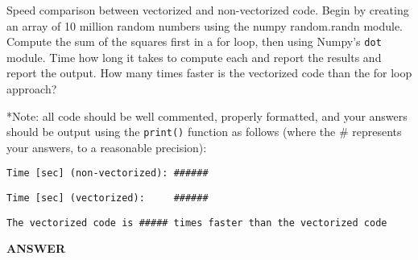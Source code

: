 \documentclass[11pt]{article}
\begin{document}
Speed comparison between vectorized and non-vectorized code. Begin by
creating an array of 10 million random numbers using the numpy
random.randn module. Compute the sum of the squares first in a for loop,
then using Numpy's \texttt{dot} module. Time how long it takes to
compute each and report the results and report the output. How many
times faster is the vectorized code than the for loop approach?

*Note: all code should be well commented, properly formatted, and your
answers should be output using the \texttt{print()} function as follows
(where the \# represents your answers, to a reasonable precision):

\texttt{Time\ {[}sec{]}\ (non-vectorized):\ \#\#\#\#\#\#}

\texttt{Time\ {[}sec{]}\ (vectorized):\ \ \ \ \ \#\#\#\#\#\#}

\texttt{The\ vectorized\ code\ is\ \#\#\#\#\#\ times\ faster\ than\ the\ vectorized\ code}

    \textbf{ANSWER}
\end{document}

